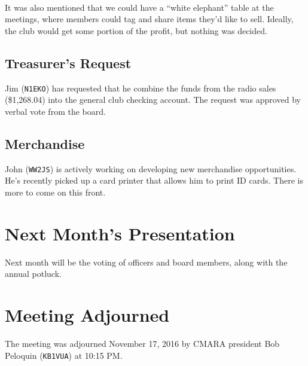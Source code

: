\documentclass[10pt,letterpaper]{article}
\begin{document}
\noindent
\\It was also mentioned that we could have a ``white elephant'' table at the meetings, where members could tag and share items they'd like to sell. Ideally, the club would get some portion of the profit, but nothing was decided.

\subsection{Treasurer's Request}

Jim (\texttt{N1EKO}) has requested that he combine the funds from the radio sales (\$1,268.04) into the general club checking account. The request was approved by verbal vote from the board.

\subsection{Merchandise}
John (\texttt{WW2JS}) is actively working on developing new merchandise opportunities. He's recently picked up a card printer that allows him to print ID cards. There is more to come on this front.

\section{Next Month's Presentation}
Next month will be the voting of officers and board members, along with the annual potluck.

\section{Meeting Adjourned}
The meeting was adjourned November 17, 2016 by CMARA president Bob Peloquin (\texttt{KB1VUA}) at 10:15 PM.
\end{document}
